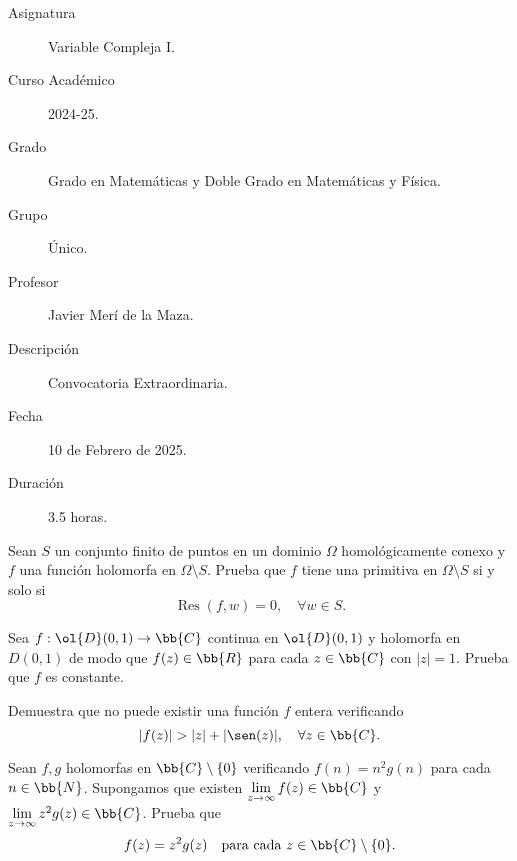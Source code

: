 \documentclass[12pt]{article}
\DeclareMathOperator{\Res}{Res}
\begin{document}

    
    

    \begin{description}
        \item[Asignatura] Variable Compleja I.
        \item[Curso Académico] 2024-25.
        \item[Grado] Grado en Matemáticas y Doble Grado en Matemáticas y Física.
        \item[Grupo] Único.
        \item[Profesor] Javier Merí de la Maza.
        \item[Descripción] Convocatoria Extraordinaria.
        \item[Fecha] 10 de Febrero de 2025.
        \item[Duración] 3.5 horas.
    \end{description}
    \newpage

    \begin{ejercicio}[2.5 puntos]
         Sean $S$ un conjunto finito de puntos en un dominio $\Omega$ homológicamente conexo y $f$ una función holomorfa en $\Omega \setminus S$. Prueba que $f$ tiene una primitiva en $\Omega \setminus S$ si y solo si
        \[
            \Res(f, w) = 0, \quad \forall w \in S.
        \]
    \end{ejercicio}

    \begin{ejercicio}[2.5 puntos]
        Sea $f : \ol{D}(0, 1) \to \bb{C}$ continua en $\ol{D}(0, 1)$ y holomorfa en $D(0, 1)$ de modo que $f(z) \in \bb{R}$ para cada $z \in \bb{C}$ con $|z| = 1$. Prueba que $f$ es constante.
    \end{ejercicio}

    \begin{ejercicio}[2.5 puntos]
        Demuestra que no puede existir una función $f$ entera verificando
        \[
            |f(z)| > |z| + |\sen(z)|, \quad \forall z \in \bb{C}.
        \]
    \end{ejercicio}

    \begin{ejercicio}[2.5 puntos]
        Sean $f, g$ holomorfas en $\bb{C} \setminus \{0\}$ verificando $f(n) = n^2 g(n)$ para cada $n \in \bb{N}$. Supongamos que existen $\lim\limits_{z \to \infty} f(z) \in \bb{C}$ y $\lim\limits_{z \to \infty} z^2 g(z) \in \bb{C}$. Prueba que
        \[
            f(z) = z^2 g(z) \quad \text{para cada } z \in \bb{C} \setminus \{0\}.
        \]
    \end{ejercicio}
\end{document}
